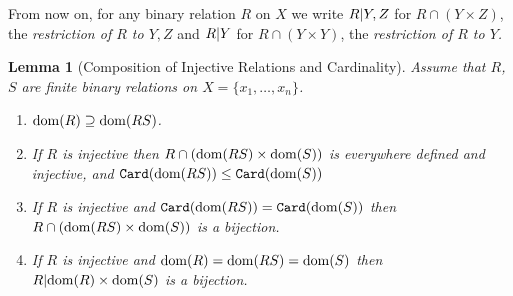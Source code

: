 \documentclass{lmcs}
\newtheorem{lemma}[theorem]{Lemma}
\begin{document}
From now on, for any binary relation $R$ on $X$
we write $R {|} Y,Z$  
for $R \cap (Y \times Z)$, the \emph{restriction of $R$ to $Y,Z$} and 
$R {|} Y$ for $R \cap (Y \times Y)$,
the \emph{restriction of $R$ to $Y$.}

\begin{lemma}[Composition of Injective Relations and Cardinality]
\label{lemma-composition-injective-relations}
Assume that $R$,$S$ are finite binary relations on $X = \{x_1,\ldots,x_n\}$.

\begin{enumerate}
\item
\label{lemma-composition-injective-relations-01}
${\rm dom}(R) \supseteq {\rm dom}(RS)$.

\item
\label{lemma-composition-injective-relations-02}
If $R$ is injective then 
$R \cap ({\rm dom}(RS) \times {\rm dom}(S))$ is everywhere defined and
injective, and ${\tt Card}({\rm dom}(RS)) \le {\tt Card}({\rm dom}(S))$

\item
\label{lemma-composition-injective-relations-03}
If $R$ is injective and ${\tt Card}({\rm dom}(RS)) = {\tt Card}({\rm dom}(S))$
then $R\cap ({\rm dom}(RS) \times {\rm dom}(S))$ is a bijection.

\item
\label{lemma-composition-injective-relations-04}
If $R$ is injective and ${\rm dom}(R)={\rm dom}(RS)={\rm dom}(S)$ 
then $R{|} {\rm dom}(R) \times {\rm dom}(S)$ is a bijection.

\end{enumerate}
\end{lemma}
\end{document}
